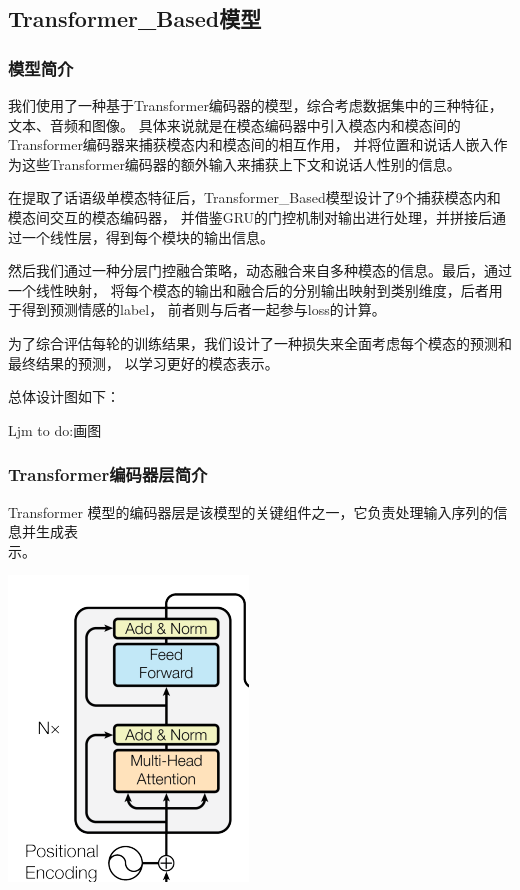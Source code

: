 \documentclass[11pt]{article}
\begin{document}
        \subsection{Transformer\_Based模型}
            \subsubsection{模型简介}
            我们使用了一种基于Transformer编码器的模型，综合考虑数据集中的三种特征，文本、音频和图像。
            具体来说就是在模态编码器中引入模态内和模态间的Transformer编码器来捕获模态内和模态间的相互作用，
            并将位置和说话人嵌入作为这些Transformer编码器的额外输入来捕获上下文和说话人性别的信息。
            
            在提取了话语级单模态特征后，Transformer\_Based模型设计了9个捕获模态内和模态间交互的模态编码器，
            并借鉴GRU的门控机制对输出进行处理，并拼接后通过一个线性层，得到每个模块的输出信息。
            
            然后我们通过一种分层门控融合策略，动态融合来自多种模态的信息。最后，通过一个线性映射，
            将每个模态的输出和融合后的分别输出映射到类别维度，后者用于得到预测情感的label，
            前者则与后者一起参与loss的计算。
            
            为了综合评估每轮的训练结果，我们设计了一种损失来全面考虑每个模态的预测和最终结果的预测，
            以学习更好的模态表示。
            
            总体设计图如下：
            
            Ljm to do:画图
            
            \subsubsection{Transformer编码器层简介}
            Transformer 模型的编码器层是该模型的关键组件之一，它负责处理输入序列的信息并生成表\\示。

            \begin{center}
                \includegraphics[scale=0.9]{graph/transformer1.png}
            \end{center}
\end{document}

